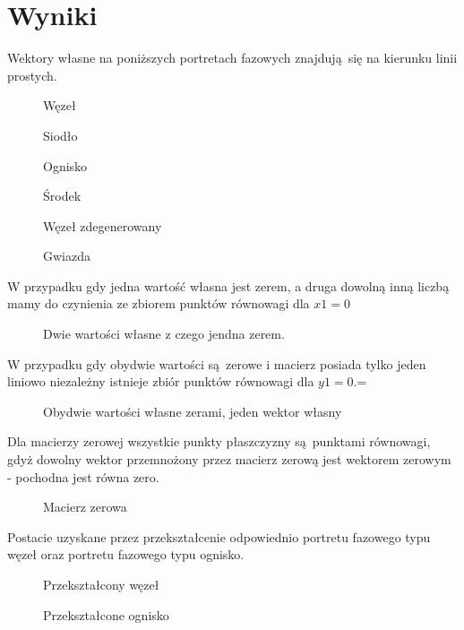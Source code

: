 \documentclass[a4paper, 12pt]{article}
\begin{document}
	\section{Wyniki}
		Wektory własne na poniższych portretach fazowych znajdują się na kierunku linii prostych.
		\begin{figure}[H]
			\centering 
			
			\caption{Węzeł}
		\end{figure}
		\begin{figure}[H]
			\centering 
			
			\caption{Siodło}
		\end{figure}
		\begin{figure}[H]
			\centering 
			
			\caption{Ognisko}
		\end{figure}
		\begin{figure}[H]
			\centering 
			
			\caption{Środek}
		\end{figure}
		\begin{figure}[H]
			\centering 
			
			\caption{Węzeł zdegenerowany}
		\end{figure}	
		\begin{figure}[H]
			\centering 
			
			\caption{Gwiazda}
		\end{figure}
		\newpage
		W przypadku gdy jedna wartość własna jest zerem, a druga dowolną inną liczbą mamy do czynienia ze zbiorem punktów równowagi dla $x1 = 0$
		\begin{figure}[H]
			\centering 
			
			\caption{Dwie wartości własne z czego jendna zerem.}
		\end{figure}
		W przypadku gdy obydwie wartości są zerowe i macierz posiada tylko jeden liniowo niezależny istnieje zbiór punktów równowagi dla $y1 = 0$.=
		\begin{figure}[H]
			\centering 
			
			\caption{Obydwie wartości własne zerami, jeden wektor własny}
		\end{figure}
		\newpage
		Dla macierzy zerowej wszystkie punkty płaszczyzny są punktami równowagi, gdyż dowolny wektor przemnożony przez macierz zerową jest wektorem zerowym - pochodna jest równa zero.
		\begin{figure}[H]
			\centering 
			
			\caption{Macierz zerowa}
		\end{figure}
		Postacie uzyskane przez przekształcenie odpowiednio portretu fazowego typu węzeł oraz portretu fazowego typu ognisko. 
		\begin{figure}[H]
			\centering 
			
			\caption{Przekształcony węzeł}
		\end{figure}
		\begin{figure}[H]
			\centering 
			
			\caption{Przekształcone ognisko}
		\end{figure}
\end{document}

